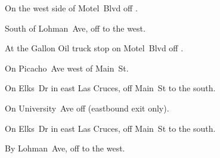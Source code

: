 
\begin{LocationList}

On the west side of  Motel~Blvd off  .

South of Lohman~Ave, off   to the west.

At the Gallon Oil truck stop on  Motel~Blvd off  .

\Location{\GarageHQ \Garage}
On  Picacho~Ave west of Main~St.

On Elks~Dr in east Las Cruces, off  Main~St to the south.

On University~Ave off   (eastbound exit only).

On Elks~Dr in east Las Cruces, off  Main~St to the south.

By Lohman~Ave, off   to the west.

\end{LocationList}
